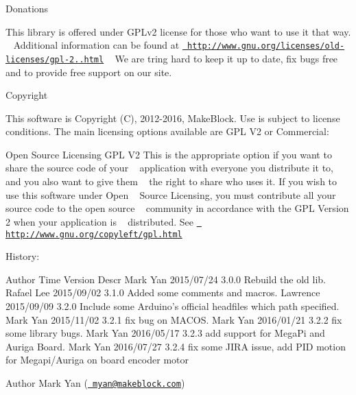 \begin{DoxyParagraph}{Donations}

\end{DoxyParagraph}
This library is offered under GPLv2 license for those who want to use it that way. ~\newline
Additional information can be found at \href{http://www.gnu.org/licenses/old-licenses/gpl-2.0.html}{\texttt{ http\+://www.\+gnu.\+org/licenses/old-\/licenses/gpl-\/2..\+html}} ~\newline
We are tring hard to keep it up to date, fix bugs free and to provide free support on our site. ~\newline
 \begin{DoxyParagraph}{Copyright}

\end{DoxyParagraph}
This software is Copyright (C), 2012-\/2016, Make\+Block. Use is subject to license ~\newline
conditions. The main licensing options available are GPL V2 or Commercial\+: ~\newline
 \begin{DoxyParagraph}{Open Source Licensing GPL V2}
This is the appropriate option if you want to share the source code of your ~\newline
application with everyone you distribute it to, and you also want to give them ~\newline
the right to share who uses it. If you wish to use this software under Open ~\newline
Source Licensing, you must contribute all your source code to the open source ~\newline
community in accordance with the GPL Version 2 when your application is ~\newline
distributed. See \href{http://www.gnu.org/copyleft/gpl.html}{\texttt{ http\+://www.\+gnu.\+org/copyleft/gpl.\+html}}
\end{DoxyParagraph}
\begin{DoxyParagraph}{History\+:}

\begin{DoxyPre}
Author           Time           Version          Descr
Mark Yan         2015/07/24     3.0.0            Rebuild the old lib.
Rafael Lee       2015/09/02     3.1.0            Added some comments and macros.
Lawrence         2015/09/09     3.2.0            Include some Arduino's official headfiles which path specified.
Mark Yan         2015/11/02     3.2.1            fix bug on MACOS.
Mark Yan         2016/01/21     3.2.2            fix some library bugs.
Mark Yan         2016/05/17     3.2.3            add support for MegaPi and Auriga Board.
Mark Yan         2016/07/27     3.2.4            fix some JIRA issue, add PID motion for Megapi/Auriga on board encoder motor
\end{DoxyPre}

\end{DoxyParagraph}
\begin{DoxyAuthor}{Author}
Mark Yan (\href{mailto:myan@makeblock.com}{\texttt{ myan@makeblock.\+com}}) 
\end{DoxyAuthor}
